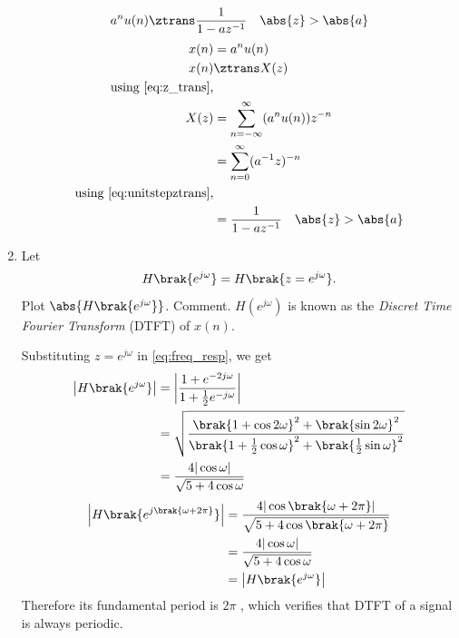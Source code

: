 \documentclass[journal,12pt,twocolumn]{IEEEtran}
\renewcommand\thesection{\arabic{section}}
\begin{document}
\begin{enumerate}[label=\thesection.\arabic*]
\begin{equation}
		      \label{eq:anun}
		      a^nu(n) \ztrans \frac{1}{1-az^{-1}} \quad \abs{z} > \abs{a}
	      \end{equation}
	      \solution
	      \begin{align}
		      x(n) & = a^n u(n)                                    \\
		      x(n) & \ztrans X(z)                                  \\
		      \notag\text{using \eqref{eq:z_trans},}               \\
		      X(z) & = \sum_{n=-\infty}^{\infty} (a^n u(n))z^{-n}  \\
		           & = \sum_{n=0}^{\infty} (a^{-1}z)^{-n}          \\
		      \notag\text{using \eqref{eq:unitstepztrans},}        \\
		           & = \frac{1}{1-az^{-1}} \quad \abs{z} > \abs{a}
	      \end{align}

	\item
	      Let
	      \begin{equation}
		      H\brak{e^{j \omega}} = H\brak{z = e^{j \omega}}.
	      \end{equation}
	      Plot $\abs{H\brak{e^{j \omega}}}$.  Comment.  $H(e^{j \omega})$ is
	      known as the {\em Discret Time Fourier Transform} (DTFT) of $x(n)$.
	      \\
	      \solution

	      Substituting $z = e^{j \omega}$ in \eqref{eq:freq_resp}, we get
	      \begin{align}
		      \left|H\brak{e^{j\omega}}\right| & = \left|\frac{1 + e^{-2j\omega}}{1 + \frac{1}{2}e^{-j\omega}}\right|                                                                         \\
		                                       & = \sqrt{\frac{\brak{1 + \cos{2\omega}}^2 + \brak{\sin{2\omega}}^2}{\brak{1 + \frac{1}{2}\cos{\omega}}^2 + \brak{\frac{1}{2}\sin{\omega}}^2}} \\
		                                       & = \frac{4|\cos{\omega}|}{\sqrt{5 + 4\cos{\omega}}}
	      \end{align}
	      \begin{align}
		      \left|H\brak{e^{j\brak{\omega + 2\pi}}}\right| & = \frac{4|\cos\brak{\omega + 2\pi}|}{\sqrt{5 + 4\cos\brak{\omega + 2\pi}}} \\
		                                                     & = \frac{4|\cos{\omega}|}{\sqrt{5 + 4\cos{\omega}}}                         \\
		                                                     & = \left|H\brak{e^{j\omega}}\right|
	      \end{align}
	      Therefore its fundamental period is $2\pi$ , which verifies that DTFT of a signal is always periodic.


\end{enumerate}
\end{document}
